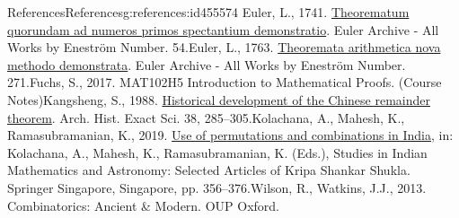 \documentclass[oneside,10pt,]{book}
\numberwithin{equation}{section}
\begin{document}
%
%
%
\typeout{************************************************}
\typeout{************************************************}
%
\begin{references-chapter-numberless}{References}{}{References}{}{}{g:references:id455574}
Euler, L., 1741. \href{https://scholarlycommons.pacific.edu/euler-works/54/}{Theorematum quorundam ad numeros primos spectantium demonstratio}. Euler Archive - All Works by Eneström Number. 54.Euler, L., 1763. \href{https://scholarlycommons.pacific.edu/euler-works/271/}{Theoremata arithmetica nova methodo demonstrata}. Euler Archive - All Works by Eneström Number. 271.Fuchs, S., 2017. MAT102H5 Introduction to Mathematical Proofs. (Course Notes)Kangsheng, S., 1988. \href{https://doi.org/10.1007/BF00357063}{Historical development of the Chinese remainder theorem}. Arch. Hist. Exact Sci. 38, 285–305.Kolachana, A., Mahesh, K., Ramasubramanian, K., 2019. \href{https://doi.org/10.1007/978-981-13-7326-8_18}{Use of permutations and combinations in India}, in: Kolachana, A., Mahesh, K., Ramasubramanian, K. (Eds.), Studies in Indian Mathematics and Astronomy: Selected Articles of Kripa Shankar Shukla. Springer Singapore, Singapore, pp. 356–376.Wilson, R., Watkins, J.J., 2013. Combinatorics: Ancient \& Modern. OUP Oxford.\end{references-chapter-numberless}
\end{document}
